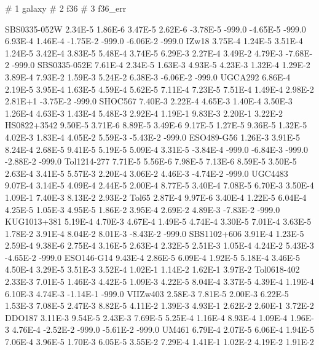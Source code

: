 # 1 galaxy
# 2 f36
# 3 f36_err


   SBS0335-052W   2.34E-5  1.86E-6   3.47E-5  2.62E-6  -3.78E-5   -999.0  -4.65E-5   -999.0   6.93E-4  1.46E-4   -1.75E-2  -999.0  -6.06E-2   -999.0
         IZw18    3.75E-4  1.24E-5   3.51E-4  1.24E-5   3.42E-4  3.83E-5   5.48E-4  3.74E-5   6.29E-3  2.27E-4   3.49E-2  4.79E-3  -7.68E-2   -999.0
   SBS0335-052E   7.61E-4  2.34E-5   1.63E-3  4.93E-5   4.23E-3  1.32E-4   1.29E-2  3.89E-4   7.93E-2  1.59E-3   5.24E-2  6.38E-3  -6.06E-2   -999.0
        UGCA292   6.86E-4  2.19E-5   3.95E-4  1.63E-5   4.59E-4  5.62E-5   7.11E-4  7.23E-5   7.51E-4  1.49E-4   2.98E-2  2.81E+1  -3.75E-2   -999.0
        SHOC567   7.40E-3  2.22E-4   4.65E-3  1.40E-4   3.50E-3  1.26E-4   4.63E-3  1.43E-4   5.48E-3  2.92E-4   1.19E-1  9.83E-3   2.20E-1  3.22E-2 
    HS0822+3542   9.50E-5  3.71E-6   8.89E-5  3.49E-6   9.17E-5  1.27E-5   9.36E-5  1.32E-5   4.02E-3  1.83E-4   4.05E-2  5.59E-3  -5.43E-2   -999.0
     ESO489-G56   1.26E-3  3.91E-5   8.24E-4  2.68E-5   9.41E-5  5.19E-5   5.09E-4  3.31E-5  -3.84E-4   -999.0  -6.84E-3   -999.0  -2.88E-2   -999.0
    Tol1214-277   7.71E-5  5.56E-6   7.98E-5  7.13E-6   8.59E-5  3.50E-5   2.63E-4  3.41E-5   5.57E-3  2.20E-4   3.06E-2  4.46E-3  -4.74E-2   -999.0
        UGC4483   9.07E-4  3.14E-5   4.09E-4  2.44E-5   2.00E-4  8.77E-5   3.40E-4  7.08E-5   6.70E-3  3.50E-4   1.09E-1  7.40E-3   8.13E-2  2.93E-2 
          Tol65   2.87E-4  9.97E-6   3.40E-4  1.22E-5   6.04E-4  4.25E-5   1.05E-3  4.95E-5   1.86E-2  3.95E-4   2.69E-2  4.89E-3  -7.83E-2   -999.0
    KUG1013+381   5.19E-4  4.70E-3   4.67E-4  1.49E-5   4.74E-4  3.30E-5   7.01E-4  3.63E-5   1.78E-2  3.91E-4   8.04E-2  8.01E-3  -8.43E-2   -999.0
    SBS1102+606   3.91E-4  1.23E-5   2.59E-4  9.38E-6   2.75E-4  3.16E-5   2.63E-4  2.32E-5   2.51E-3  1.05E-4   4.24E-2  5.43E-3  -4.65E-2   -999.0
     ESO146-G14   9.43E-4  2.86E-5   6.09E-4  1.92E-5   5.18E-4  3.46E-5   4.50E-4  3.29E-5   3.51E-3  3.52E-4   1.02E-1  1.14E-2   1.62E-1  3.97E-2 
    Tol0618-402   2.33E-3  7.01E-5   1.46E-3  4.42E-5   1.09E-3  4.22E-5   8.04E-4  3.37E-5   4.39E-4  1.19E-4   6.10E-3  4.74E-3  -1.14E-1   -999.0
      VIIZw403    2.58E-3  7.81E-5   2.00E-3  6.22E-5   1.53E-3  7.08E-5   2.47E-3  8.82E-5   4.11E-2  1.39E-3   4.93E-1  2.62E-2   2.60E-1  3.72E-2 
         DDO187   3.11E-3  9.54E-5   2.43E-3  7.69E-5   5.25E-4  1.16E-4   8.93E-4  1.09E-4   1.96E-3  4.76E-4  -2.52E-2   -999.0  -5.61E-2   -999.0
          UM461   6.79E-4  2.07E-5   6.06E-4  1.94E-5   7.06E-4  3.96E-5   1.70E-3  6.05E-5   3.55E-2  7.29E-4   1.41E-1  1.02E-2   4.19E-2  1.91E-2 
